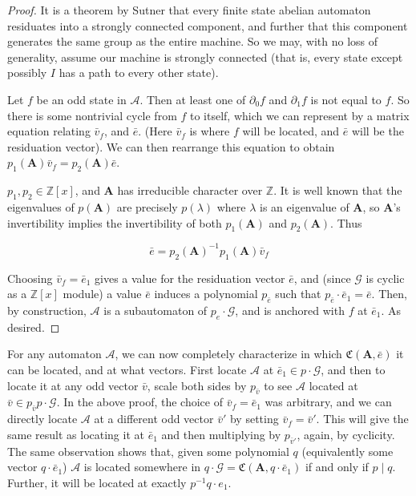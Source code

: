 \documentclass[runningheads]{llncs}
\newcommand{\A}{\mathcal{A}}
\newcommand{\G}{\mathcal{G}}
\newcommand{\C}{\mathfrak{C}(\Am,\e)}
\newcommand{\Z}{\mathbb{Z}}
\newcommand{\2}{\textbf{2}}
\newcommand{\Am}{\textbf{A}}
\newcommand{\del}{\partial}
\newcommand{\vv}{\bar{v}}
\newcommand{\e}{\bar{e}}
\begin{document}
\begin{proof}
  It is a theorem by Sutner \cite{Sutner18:abelian_automata} that every 
  finite state abelian automaton residuates into a strongly connected component, 
  and further that this component generates the same group as the entire 
  machine. So we may, with no loss of generality, assume our machine is 
  strongly connected (that is, every state except possibly $I$ has a path to
  every other state).

  Let $f$ be an odd state in $\A$. Then at least one of $\del_0 f$ and 
  $\del_1 f$ is not equal to $f$. So there is some nontrivial cycle
  from $f$ to itself, which we can represent by a matrix equation 
  relating $\vv_f$, and $\e$. (Here $\vv_f$ is where $f$ will be located, 
  and $\e$ will be the residuation vector). 
  We can then rearrange this equation to obtain 
  $p_1(\Am)\vv_f = p_2(\Am)\e$.

  $p_1, p_2 \in \Z[x]$, and $\Am$ has irreducible character over $\Z$.
  It is well known that the eigenvalues of $p(\Am)$ are precisely $p(\lambda)$
  where $\lambda$ is an eigenvalue of $\Am$, so $\Am$'s invertibility implies
  the invertibility of both $p_1(\Am)$ and $p_2(\Am)$. Thus

  \[ \e = p_2(\Am)^{-1}p_1(\Am)\vv_f \]

  Choosing $\vv_f = \e_1$ gives a value for the residuation vector $\e$,
  and (since $\G$ is cyclic as a $\Z[x]$ module) a value $\e$ induces a 
  polynomial $p_{\e}$ such that $p_{\e} \cdot \e_1 = \e$. 
  Then, by construction, $\A$ is a subautomaton of $p_e \cdot \G$, and is 
  anchored with $f$ at $\e_1$. As desired.
\end{proof}

For any automaton $\A$, we can now completely characterize in
which $\C$ it can be located, and at what vectors.
First locate $\A$ at $\e_1 \in p \cdot \G$, and then to locate it at
any odd vector $\vv$, scale both sides by $p_{\vv}$ to see $\A$ located at
$\vv \in p_{\vv} p \cdot \G$. 
In the above proof, the choice of $\vv_f = \e_1$ was arbitrary, and we can
directly locate $\A$ at a different odd vector $\vv'$ by setting 
$\vv_f = \vv'$. This will give the same result as locating it at $\e_1$ and 
then multiplying by $p_{\vv'}$, again, by cyclicity.
The same observation shows that, given some polynomial $q$ 
(equivalently some vector $q \cdot \e_1$) $\A$ is located somewhere in 
$q \cdot \G = \mathfrak{C}(\Am,q \cdot \e_1)$ if and only if $p \mid q$. 
Further, it will be located at exactly $p^{-1}q \cdot e_1$.
\end{document}
